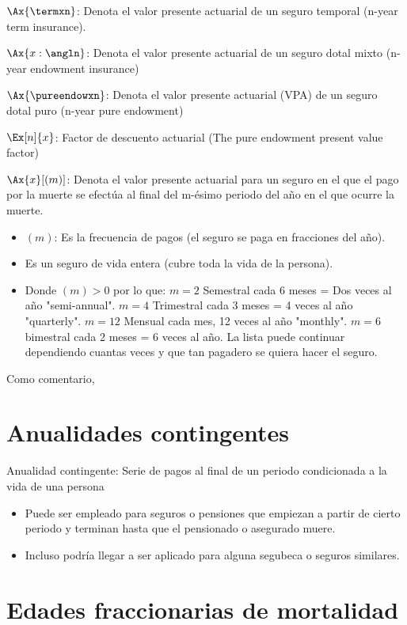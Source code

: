 \documentclass[12pt, a4paper, footinclude=true]{scrbook}
\begin{document}
$\Ax{\termxn}$: Denota el valor presente actuarial de un seguro temporal (n-year term insurance). 

$\Ax{x:\angln}$: Denota el valor presente actuarial de un seguro dotal mixto (n-year endowment insurance)

$\Ax{\pureendowxn}$: Denota el valor presente actuarial (VPA) de un seguro dotal puro (n-year pure endowment)

$\Ex[n]{x}$: Factor de descuento actuarial (The pure endowment present value factor)

$\Ax{x}[(m)]$: Denota el valor presente actuarial para un seguro en el que el pago por la muerte se efectúa al final del m-ésimo periodo del año en el que ocurre la muerte. 

\begin{itemize}
	\item $(m)$: Es la frecuencia de pagos (el seguro se paga en fracciones del año).
	\item Es un seguro de vida entera (cubre toda la vida de la persona).
	\item Donde $(m) > 0$ por lo que: 
	\subitem $m = 2$ Semestral cada 6 meses = Dos veces al año "semi-annual". 
	\subitem $m = 4$ Trimestral cada 3 meses = 4 veces al año "quarterly".
	\subitem $m = 12$ Mensual cada mes, 12 veces al año "monthly". 
	\subitem $m = 6$ bimestral cada 2 meses = 6 veces al año.
	\subitem La lista puede continuar dependiendo cuantas veces y que tan pagadero se quiera hacer el seguro.  
\end{itemize}

Como comentario, 

\section{Anualidades contingentes}

Anualidad contingente: Serie de pagos al final de un periodo condicionada a la vida de una persona

\begin{itemize}
	\item Puede ser empleado para seguros o pensiones que empiezan a partir de cierto periodo y terminan hasta que el pensionado o asegurado muere. 
	\item Incluso podría llegar a ser aplicado para alguna segubeca o seguros similares. 
\end{itemize}

\section{Edades fraccionarias de mortalidad}
\end{document}
